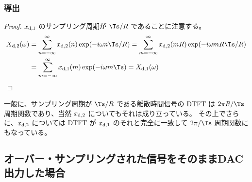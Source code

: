             \subsubsection{導出}
                \begin{proof}
                    \quad\par
                    $x_{\text{d},1}$ のサンプリング周期が $\Ts/R$ であることに注意する。
                    \begin{align*}
                        \Xdb(\omega) &= \sum_{n=-\infty}^\infty \xdb(n)\exp(-i\omega n\Ts/R) = \sum_{m=-\infty}^\infty \xdb(m R) \exp(-i\omega m R\Ts/R) \\
                        &= \sum_{m=-\infty}^\infty \xda(m) \exp(-i\omega m\Ts) = \Xda(\omega)
                    \end{align*}
                \end{proof}
                一般に、サンプリング周期が $\Ts/R$ である離散時間信号の DTFT は $2\pi R/\Ts$ 周期関数であり、当然 $x_{\text{d},2}$ についてもそれは成り立っている。
                その上でさらに、$x_{\text{d},2}$ については DTFT が $x_{\text{d},1}$ のそれと完全に一致して $2\pi/\Ts$ 周期関数にもなっている。
        \subsection{オーバー・サンプリングされた信号をそのままDAC出力した場合}
